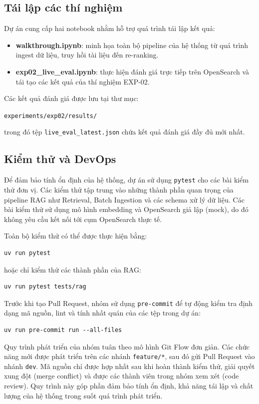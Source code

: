 \subsection{Tái lập các thí nghiệm}

Dự án cung cấp hai notebook nhằm hỗ trợ quá trình tái lập kết quả:

\begin{itemize}
    \item \textbf{walkthrough.ipynb}: minh họa toàn bộ pipeline của hệ thống từ quá trình ingest dữ liệu, truy hồi tài liệu đến re-ranking.
    \item \textbf{exp02\_live\_eval.ipynb}: thực hiện đánh giá trực tiếp trên OpenSearch và tái tạo các kết quả của thí nghiệm EXP-02.
\end{itemize}

Các kết quả đánh giá được lưu tại thư mục:

\begin{center}
    \texttt{experiments/exp02/results/}
\end{center}

trong đó tệp \texttt{live\_eval\_latest.json} chứa kết quả đánh giá đầy đủ mới nhất.

\subsection{Kiểm thử và DevOps}

Để đảm bảo tính ổn định của hệ thống, dự án sử dụng \texttt{pytest} cho các bài kiểm thử đơn vị. Các kiểm thử tập trung vào những thành phần quan trọng của pipeline RAG như Retrieval, Batch Ingestion và các schema xử lý dữ liệu. Các bài kiểm thử sử dụng mô hình embedding và OpenSearch giả lập (mock), do đó không yêu cầu kết nối tới cụm OpenSearch thực tế.

Toàn bộ kiểm thử có thể được thực hiện bằng:

\begin{verbatim}
uv run pytest
\end{verbatim}

hoặc chỉ kiểm thử các thành phần của RAG:

\begin{verbatim}
uv run pytest tests/rag
\end{verbatim}

Trước khi tạo Pull Request, nhóm sử dụng \texttt{pre-commit} để tự động kiểm tra định dạng mã nguồn, lint và tính nhất quán của các tệp trong dự án:

\begin{verbatim}
uv run pre-commit run --all-files
\end{verbatim}

Quy trình phát triển của nhóm tuân theo mô hình Git Flow đơn giản. Các chức năng mới được phát triển trên các nhánh \texttt{feature/*}, sau đó gửi Pull Request vào nhánh \texttt{dev}. Mã nguồn chỉ được hợp nhất sau khi hoàn thành kiểm thử, giải quyết xung đột (merge conflict) và được các thành viên trong nhóm xem xét (code review). Quy trình này góp phần đảm bảo tính ổn định, khả năng tái lập và chất lượng của hệ thống trong suốt quá trình phát triển.
